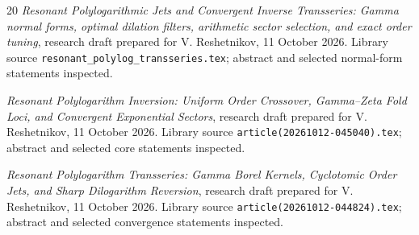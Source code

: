 \documentclass[11pt,a4paper]{article}
\numberwithin{equation}{section}
\theoremstyle{definition}\newtheorem{definition}[theorem]{Definition}
\theoremstyle{remark}\newtheorem{remark}[theorem]{Remark}
\begin{document}
\begin{thebibliography}{20}
\emph{Resonant Polylogarithmic Jets and Convergent Inverse Transseries:
Gamma normal forms, optimal dilation filters, arithmetic sector selection,
and exact order tuning}, research draft prepared for V. Reshetnikov,
11 October 2026. Library source \texttt{resonant\_polylog\_transseries.tex};
abstract and selected normal-form statements inspected.

\emph{Resonant Polylogarithm Inversion: Uniform Order Crossover,
Gamma--Zeta Fold Loci, and Convergent Exponential Sectors}, research draft
prepared for V. Reshetnikov, 11 October 2026. Library source
\texttt{article(20261012-045040).tex}; abstract and selected core statements
inspected.

\emph{Resonant Polylogarithm Transseries: Gamma Borel Kernels,
Cyclotomic Order Jets, and Sharp Dilogarithm Reversion}, research draft
prepared for V. Reshetnikov, 11 October 2026. Library source
\texttt{article(20261012-044824).tex}; abstract and selected convergence
statements inspected.
\end{thebibliography}
\end{document}
